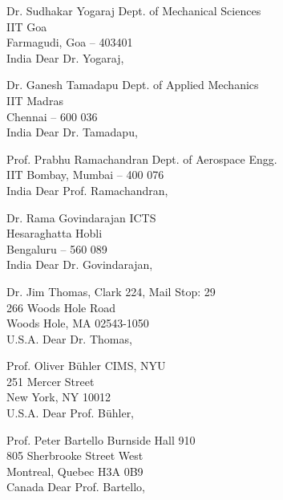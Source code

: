 Dr. Sudhakar Yogaraj
Dept. of Mechanical Sciences\\IIT Goa\\Farmagudi, Goa -- 403401\\India
Dear Dr. Yogaraj,

Dr. Ganesh Tamadapu
Dept. of Applied Mechanics\\IIT Madras\\Chennai -- 600 036\\India
Dear Dr. Tamadapu,

Prof. Prabhu Ramachandran
Dept. of Aerospace Engg.\\IIT Bombay, Mumbai -- 400 076\\India
Dear Prof. Ramachandran,

Dr. Rama Govindarajan
ICTS\\Hesaraghatta Hobli\\Bengaluru -- 560 089\\India
Dear Dr. Govindarajan,

%
%

Dr. Jim Thomas,
Clark 224, Mail Stop: 29\\266 Woods Hole Road\\Woods Hole, MA 02543-1050\\U.S.A.
Dear Dr. Thomas,

Prof. Oliver B\"uhler
CIMS, NYU\\251 Mercer Street\\ New York, NY 10012\\U.S.A.
Dear Prof. B\"uhler,


Prof. Peter Bartello
Burnside Hall 910\\805 Sherbrooke Street West\\Montreal, Quebec H3A 0B9\\Canada
Dear Prof. Bartello,


